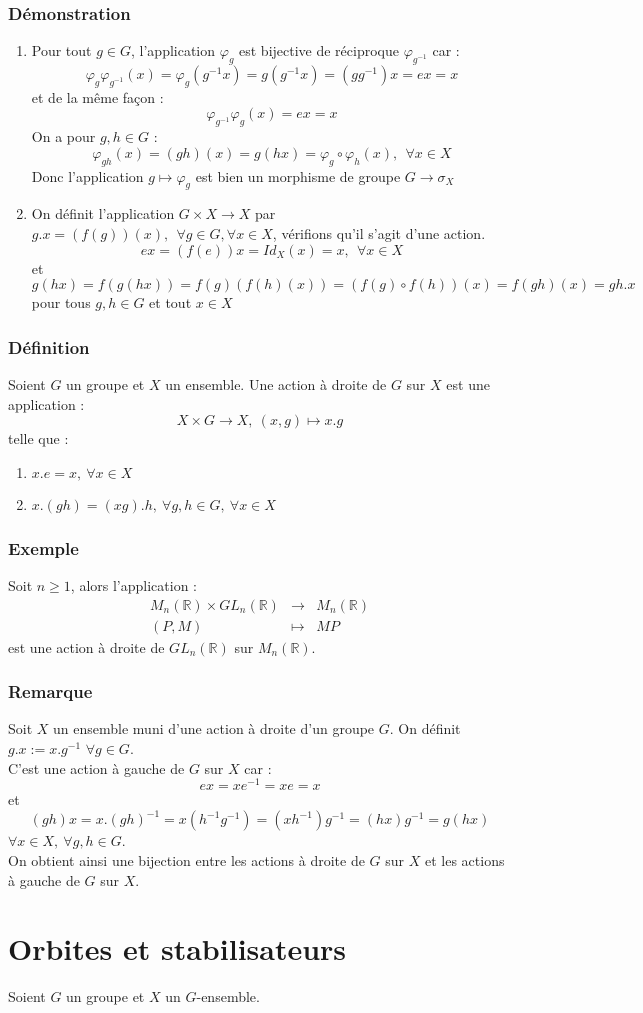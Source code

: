 \documentclass[a4paper, oneside]{report}
\newcommand{\x}{\times}
\newcommand{\R}{\mathbb{R}}
\newcommand{\defi}{\subsubsection{Définition}}
\newcommand{\dem}{\subsubsection{Démonstration}}
\newcommand{\remar}{\subsubsection{Remarque}}
\newcommand{\exem}{\subsubsection{Exemple}}
\begin{document}
\dem
\begin{enumerate}
\item Pour tout $g\in G$, l'application $\varphi_g$ est bijective de réciproque $\varphi_{g^{-1}}$ car :
$$\varphi_g\varphi_{g^{-1}}(x)=\varphi_g(g^{-1}x)=g(g^{-1}x)=(gg^{-1})x=ex=x$$
et de la même façon :
$$\varphi_{g^{-1}}\varphi_g(x)=ex=x$$
On a pour $g,h\in G$ :
$$\varphi_{gh}(x)=(gh)(x)=g(hx)=\varphi_g\circ \varphi_h(x),~~\forall x\in X$$
Donc l'application $g\mapsto \varphi_g$ est bien un morphisme de groupe $G\rightarrow \sigma_X$
\item On définit l'application $G\x X \rightarrow X$ par $g.x = (f(g))(x),~~\forall g\in G,\forall x\in X$, vérifions qu'il s'agit d'une action.\\
$$ex=(f(e))x=Id_X(x)=x,~~\forall x\in X$$
et 
$$g(hx)=f(g(hx))=f(g)(f(h)(x))=(f(g)\circ f(h) )(x)=f(gh)(x)=gh.x$$
pour tous $g,h\in G$ et tout $x\in X$
\end{enumerate}

\defi
Soient $G$ un groupe et $X$ un ensemble. Une action à droite de $G$ sur $X$ est une application :
$$X\x G\rightarrow X,~(x,g)\mapsto x.g$$
telle que :
\begin{enumerate}
\item $x.e=x,~\forall x\in X$
\item $x.(gh)=(xg).h,~\forall g,h\in G,~\forall x\in X$
\end{enumerate}

\exem
Soit $n\geq 1$, alors l'application :
$$\begin{array}{lll}
M_n(\R)\x GL_n(\R)&\rightarrow & M_n(\R)\\
(P,M)&\mapsto & MP
\end{array}$$
est une action à droite de $GL_n(\R)$ sur $M_n(\R)$.

\remar
Soit $X$ un ensemble muni d'une action à droite d'un groupe $G$. On définit $g.x := x.g^{-1}$ $\forall g\in G$.\\
C'est une action à gauche de $G$ sur $X$ car :
$$ex=xe^{-1}=xe=x$$
et 
$$(gh)x=x.(gh)^{-1}=x(h^{-1}g^{-1})=(xh^{-1})g^{-1}=(hx)g^{-1}=g(hx)$$
$\forall x\in X, ~\forall g,h\in G$.\\
On obtient ainsi une bijection entre les actions à droite de $G$ sur $X$ et les actions à gauche de $G$ sur $X$.

\section{Orbites et stabilisateurs}
Soient $G$ un groupe et $X$ un $G$-ensemble.
\end{document}
